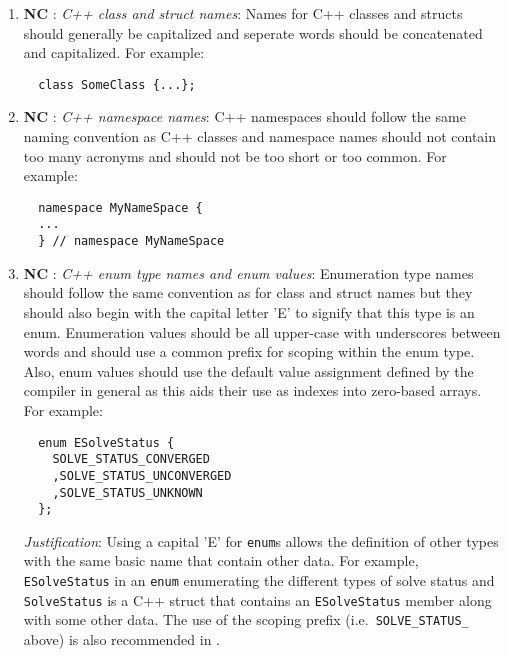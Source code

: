 \begin{enumerate}


{}\item{}\textbf{NC }:
{}\textit{C++ class and struct names}: Names for C++ classes and structs
should generally be capitalized and seperate words should be concatenated and
capitalized.  For example:

{\small\begin{verbatim}
  class SomeClass {...};
\end{verbatim}}

{}\item{}\textbf{NC }:
{}\textit{C++ namespace names}: C++ namespaces should follow the same
naming convention as C++ classes and namespace names should not contain too
many acronyms and should not be too short or too common.  For example:

{\small\begin{verbatim}
  namespace MyNameSpace {
  ...
  } // namespace MyNameSpace 
\end{verbatim}}

{}\item{}\textbf{NC }:
{}\textit{C++ enum type names and enum values}: Enumeration type names
should follow the same convention as for class and struct names but they
should also begin with the capital letter 'E' to signify that this type is an
enum.  Enumeration values should be all upper-case with underscores between
words and should use a common prefix for scoping within the enum type.  Also,
enum values should use the default value assignment defined by the compiler in
general as this aids their use as indexes into zero-based arrays.  For
example:

{\small\begin{verbatim}
  enum ESolveStatus {
    SOLVE_STATUS_CONVERGED
    ,SOLVE_STATUS_UNCONVERGED
    ,SOLVE_STATUS_UNKNOWN
  };
\end{verbatim}}

{}\textit{Justification}: Using a capital 'E' for {}\texttt{enum}s allows the
definition of other types with the same basic name that contain other data.
For example, {}\texttt{ESolveStatus} in an {}\texttt{enum} enumerating the
different types of solve status and {}\texttt{SolveStatus} is a C++ struct
that contains an {}\texttt{ESolveStatus} member along with some other data.
The use of the scoping prefix (i.e.\ {}\texttt{SOLVE\-\_STATUS\_} above) is
also recommended in {}\cite[Section 11.4]{CodeComplete2nd04}.


\end{enumerate}
